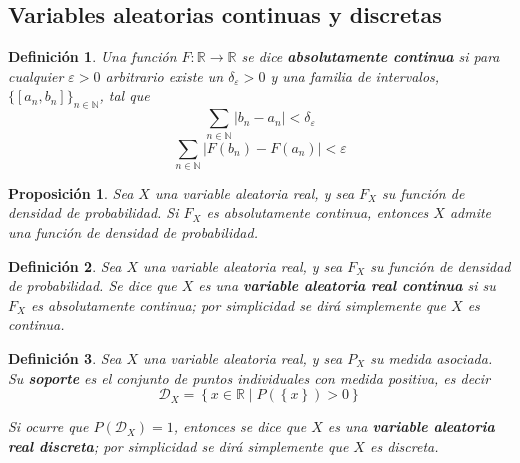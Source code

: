 \documentclass[12pt,letterpaper]{book}
\newtheorem{definicion}{Definición}[chapter]
\newtheorem{proposicion}[teorema]{Proposición}
\newcommand{\R}{\mathbb{R}}
\newcommand{\N}{\mathbb{N}}
\newcommand{\abso}[1]{\left| #1 \right|}
\newcommand{\talque}{\mathrel{}\middle|\mathrel{}}
\begin{document}

\subsection{Variables aleatorias continuas y discretas}

\begin{definicion}
Una función $F: \R \rightarrow \R$ se dice \textbf{absolutamente continua} si para cualquier $\varepsilon>0$ arbitrario existe un $\delta_\varepsilon>0$ y una familia de intervalos, $\{ [a_n, b_n]\}_{n\in \N}$, tal que
\begin{equation}
\sum_{n\in \N} \abso{b_n - a_n} < \delta_\varepsilon
\end{equation}
\begin{equation}
\sum_{n\in \N} \abso{F(b_n) - F(a_n)} < \varepsilon 
\end{equation}
\end{definicion}

\begin{proposicion}
Sea $X$ una variable aleatoria real, y sea $F_X$ su función de densidad de probabilidad.
%
Si $F_X$ es absolutamente continua, entonces $X$ admite una función de densidad de probabilidad.
\end{proposicion}

\begin{definicion}
Sea $X$ una variable aleatoria real, y sea $F_X$ su función de densidad de probabilidad.
%
Se dice que $X$ es una \textbf{variable aleatoria real continua} si su $F_X$ es absolutamente continua; por simplicidad se dirá simplemente que $X$ es continua.
\end{definicion}

\begin{definicion}
Sea $X$ una variable aleatoria real, y sea $P_X$ su medida asociada.
%
Su \textbf{soporte} es el conjunto de puntos individuales con medida positiva, es decir
\begin{equation}
\mathcal{D}_X = \left\{ x\in \R \talque P\left( \left\{ x\right\} \right)>0 \right\}
\end{equation}

Si ocurre que $P(\mathcal{D}_X) = 1$, entonces se dice que $X$ es una \textbf{variable aleatoria real discreta}; por simplicidad se dirá simplemente que $X$ es discreta.
\end{definicion}
\end{document}
